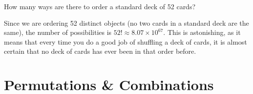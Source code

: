 \begin{example}
How many ways are there to order a standard deck of 52 cards?

Since we are ordering 52 distinct objects (no two cards in a standard deck are the same), the number of possibilities is $52! \approx 8.07 \times 10^{67}$. This is astonishing, as it means that every time you do a good job of shuffling a deck of cards, it is almost certain that no deck of cards has ever been in that order before.
\end{example}








\section{Permutations \& Combinations}\label{PermutationsSec}

